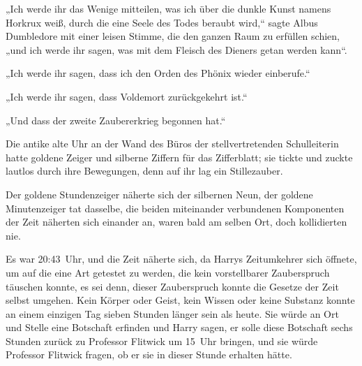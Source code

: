 „Ich werde ihr das Wenige mitteilen, was ich über die dunkle Kunst namens Horkrux weiß, durch die eine Seele des Todes beraubt wird,“ sagte Albus Dumbledore mit einer leisen Stimme, die den ganzen Raum zu erfüllen schien, „und ich werde ihr sagen, was mit dem Fleisch des Dieners getan werden kann“.

„Ich werde ihr sagen, dass ich den Orden des Phönix wieder einberufe.“

„Ich werde ihr sagen, dass Voldemort zurückgekehrt ist.“

„Und dass der zweite Zaubererkrieg begonnen hat.“


Die antike alte Uhr an der Wand des Büros der stellvertretenden Schulleiterin hatte goldene Zeiger und silberne Ziffern für das Zifferblatt; sie tickte und zuckte lautlos durch ihre Bewegungen, denn auf ihr lag ein Stillezauber.

Der goldene Stundenzeiger näherte sich der silbernen Neun, der goldene Minutenzeiger tat dasselbe, die beiden miteinander verbundenen Komponenten der Zeit näherten sich einander an, waren bald am selben Ort, doch kollidierten nie.

Es war 20:43~Uhr, und die Zeit näherte sich, da Harrys Zeitumkehrer sich öffnete, um auf die eine Art getestet zu werden, die kein vorstellbarer Zauberspruch täuschen konnte, es sei denn, dieser Zauberspruch konnte die Gesetze der Zeit selbst umgehen. Kein Körper oder Geist, kein Wissen oder keine Substanz konnte an einem einzigen Tag sieben Stunden länger sein als heute. Sie würde an Ort und Stelle eine Botschaft erfinden und Harry sagen, er solle diese Botschaft sechs Stunden zurück zu Professor Flitwick um 15~Uhr bringen, und sie würde Professor Flitwick fragen, ob er sie in dieser Stunde erhalten hätte.

